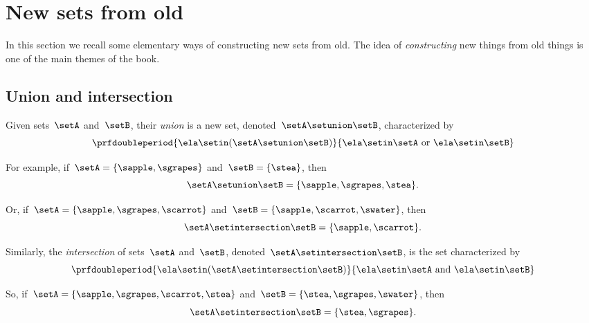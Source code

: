 
\section{New sets from old}

In this section we recall some elementary ways of constructing new sets from old.
% 
The idea of \emph{constructing} new things from old things is one of the main themes of the book.

\subsection{Union and intersection}

Given sets~$\setA$ and~$\setB$, their \emph{union} is a new set, denoted~$\setA \setunion \setB$, characterized by
\begin{equation*}
    \prfdoubleperiod
    {\ela \setin(\setA \setunion \setB)}{\ela \setin\setA \ \text{or} \ \ela \setin\setB}
\end{equation*}

For example, if~$\setA = \{ \sapple, \sgrapes \}$ and~$\setB = \{ \stea \}$, then
\begin{equation*}
    \setA \setunion \setB = \{ \sapple, \sgrapes, \stea \}.
\end{equation*}

Or, if~$\setA = \{ \sapple, \sgrapes, \scarrot \}$ and~$\setB = \{ \sapple, \scarrot, \swater \}$, then
\begin{equation*}
    \setA \setintersection \setB = \{ \sapple, \scarrot \}.
\end{equation*}

Similarly, the \emph{intersection} of sets~$\setA$ and~$\setB$, denoted~$\setA \setintersection \setB$, is the set characterized by
\begin{equation*}
    \prfdoubleperiod{ \ela \setin(\setA \setintersection \setB)}{\ela \setin\setA \ \text{and} \ \ela \setin\setB}
\end{equation*}

So, if~$\setA = \{ \sapple, \sgrapes, \scarrot, \stea \}$ and~$\setB = \{ \stea, \sgrapes, \swater \}$, then
\begin{equation*}
    \setA \setintersection \setB = \{ \stea, \sgrapes \}.
\end{equation*}


